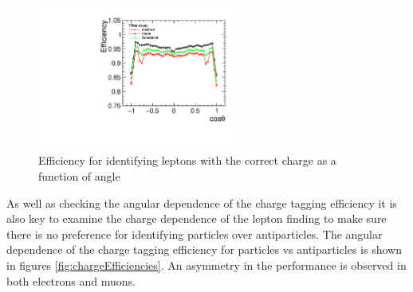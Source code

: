 \begin{figure}
  \centering
  \includegraphics[width=0.6\textwidth]{figures/NetEfficiencys}
  \caption[Charge Tagging Efficiency]{Efficiency for identifying leptons with the correct charge as a function of angle}
  \label{fig:netefficiency}
\end{figure}

As well as checking the angular dependence of the charge tagging efficiency it is also key to examine the charge dependence of the lepton finding to make sure there is no preference for identifying particles over antiparticles. The angular dependence of the charge tagging efficiency for particles vs antiparticles is shown in figures \ref{fig:chargeEfficiencies}. An asymmetry in the performance is observed in both electrons and muons.

